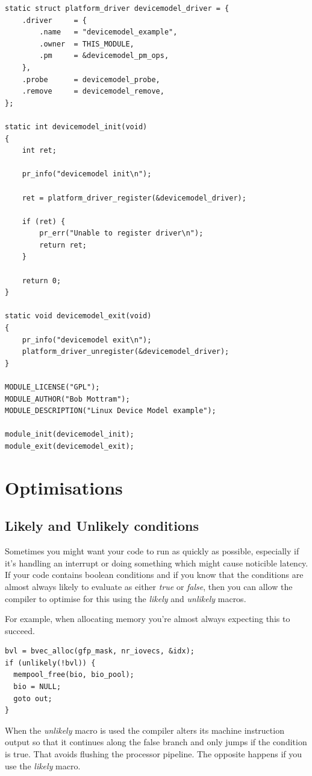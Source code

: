 \documentclass[11pt]{article}
\begin{document}
\begin{verbatim}
static struct platform_driver devicemodel_driver = {
    .driver     = {
        .name   = "devicemodel_example",
        .owner  = THIS_MODULE,
        .pm     = &devicemodel_pm_ops,
    },
    .probe      = devicemodel_probe,
    .remove     = devicemodel_remove,
};

static int devicemodel_init(void)
{
    int ret;

    pr_info("devicemodel init\n");

    ret = platform_driver_register(&devicemodel_driver);

    if (ret) {
        pr_err("Unable to register driver\n");
        return ret;
    }

    return 0;
}

static void devicemodel_exit(void)
{
    pr_info("devicemodel exit\n");
    platform_driver_unregister(&devicemodel_driver);
}

MODULE_LICENSE("GPL");
MODULE_AUTHOR("Bob Mottram");
MODULE_DESCRIPTION("Linux Device Model example");

module_init(devicemodel_init);
module_exit(devicemodel_exit);
\end{verbatim}
\section*{Optimisations}
\label{sec:orgfdaa465}
\subsection*{Likely and Unlikely conditions}
\label{sec:org5b6194a}
Sometimes you might want your code to run as quickly as possible, especially if it's handling an interrupt or doing something which might cause noticible latency. If your code contains boolean conditions and if you know that the conditions are almost always likely to evaluate as either \emph{true} or \emph{false}, then you can allow the compiler to optimise for this using the \emph{likely} and \emph{unlikely} macros.

For example, when allocating memory you're almost always expecting this to succeed.

\begin{verbatim}
bvl = bvec_alloc(gfp_mask, nr_iovecs, &idx);
if (unlikely(!bvl)) {
  mempool_free(bio, bio_pool);
  bio = NULL;
  goto out;
}
\end{verbatim}

When the \emph{unlikely} macro is used the compiler alters its machine instruction output so that it continues along the false branch and only jumps if the condition is true. That avoids flushing the processor pipeline. The opposite happens if you use the \emph{likely} macro.
\end{document}
